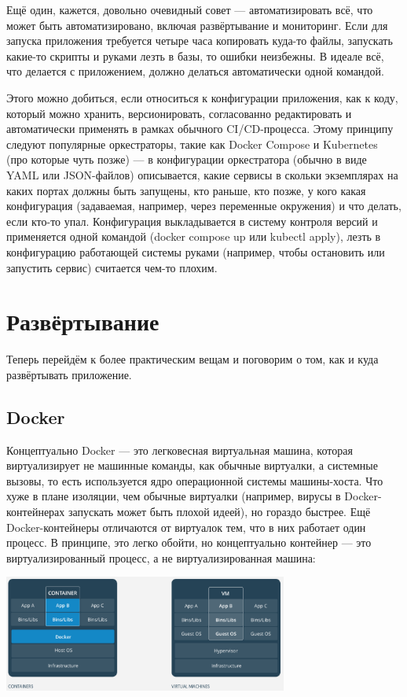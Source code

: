 \documentclass{../text-style}
\begin{document}
Ещё один, кажется, довольно очевидный совет --- автоматизировать всё, что может быть автоматизировано, включая развёртывание и мониторинг. Если для запуска приложения требуется четыре часа копировать куда-то файлы, запускать какие-то скрипты и руками лезть в базы, то ошибки неизбежны. В идеале всё, что делается с приложением, должно делаться автоматически одной командой.

Этого можно добиться, если относиться к конфигурации приложения, как к коду, который можно хранить, версионировать, согласованно редактировать и автоматически применять в рамках обычного CI/CD-процесса. Этому принципу следуют популярные оркестраторы, такие как Docker Compose и Kubernetes (про которые чуть позже) --- в конфигурации оркестратора (обычно в виде YAML или JSON-файлов) описывается, какие сервисы в скольки экземплярах на каких портах должны быть запущены, кто раньше, кто позже, у кого какая конфигурация (задаваемая, например, через переменные окружения) и что делать, если кто-то упал. Конфигурация выкладывается в систему контроля версий и применяется одной командой (docker compose up или kubectl apply), лезть в конфигурацию работающей системы руками (например, чтобы остановить или запустить сервис) считается чем-то плохим.

\section{Развёртывание}

Теперь перейдём к более практическим вещам и поговорим о том, как и куда развёртывать приложение.

\subsection{Docker}

Концептуально Docker --- это легковесная виртуальная машина, которая виртуализирует не машинные команды, как обычные виртуалки, а системные вызовы, то есть используется ядро операционной системы машины-хоста. Что хуже в плане изоляции, чем обычные виртуалки (например, вирусы в Docker-контейнерах запускать может быть плохой идеей), но гораздо быстрее. Ещё Docker-контейнеры отличаются от виртуалок тем, что в них работает один процесс. В принципе, это легко обойти, но концептуально контейнер --- это виртуализированный процесс, а не виртуализированная машина:

\begin{center}
    \includegraphics[width=0.7\textwidth]{docker.png}
\end{center}
\end{document}
